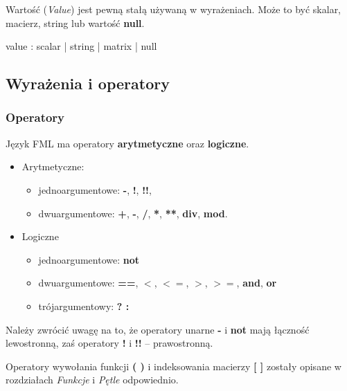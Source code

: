 \documentclass[12pt,a4paper]{article}
\begin{document}
Wartość (\emph{Value}) jest pewną stałą używaną w wyrażeniach. Może to być skalar, macierz, string lub wartość \textbf{null}.

\begin{rail}

  value : scalar | string | matrix | null

\end{rail}

\subsection{Wyrażenia i operatory}

\subsubsection{Operatory}
Język FML ma operatory \textbf{arytmetyczne} oraz \textbf{logiczne}.

\medskip
\begin{itemize}
  \item Arytmetyczne: 
  \begin{itemize}

    \item jednoargumentowe: 
    \textbf{-}, \textbf{!}, \textbf{!!},
  
    \item dwuargumentowe:
    \textbf{+}, \textbf{-}, \textbf{/}, \textbf{*}, \textbf{**}, \textbf{div}, \textbf{mod}.
    
  \end{itemize}
  
  \item Logiczne
  \begin{itemize}
  
    \item jednoargumentowe:
    \textbf{not}
    \item dwuargumentowe:
    \textbf{==}, \textbf{$<$}, \textbf{$<=$}, \textbf{$>$}, \textbf{$>=$}, \textbf{and}, \textbf{or} 
    \item trójargumentowy:
    \textbf{? :}
  \end{itemize}
\end{itemize}

Należy zwrócić uwagę na to, że operatory unarne \textbf{-} i \textbf{not} mają łączność lewostronną, zaś operatory \textbf{!} i \textbf{!!} -- prawostronną.

Operatory wywołania funkcji \textbf{( )} i indeksowania macierzy \textbf{[ ]} zostały opisane w rozdziałach \emph{Funkcje} i \emph{Pętle} odpowiednio. 
\end{document}

